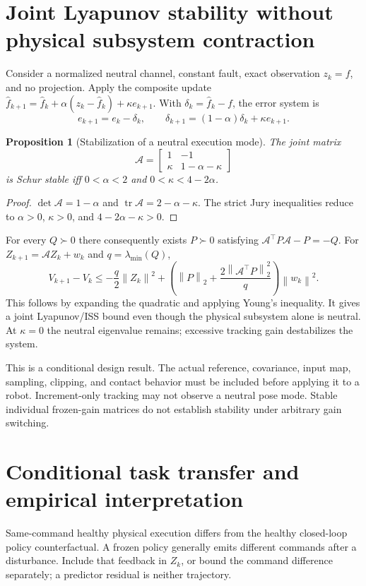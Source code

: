 \documentclass[11pt]{article}
\newtheorem{proposition}{Proposition}
\newcommand{\norm}[1]{\left\lVert#1\right\rVert}
\begin{document}
\section{Joint Lyapunov stability without physical subsystem contraction}
Consider a normalized neutral channel, constant fault, exact observation
$z_k=f$, and no projection. Apply the composite update
$\hat f_{k+1}=\hat f_k+\alpha(z_k-\hat f_k)+\kappa e_{k+1}$.
With $\delta_k=\hat f_k-f$, the error system is
\begin{equation}
 e_{k+1}=e_k-\delta_k,\qquad
 \delta_{k+1}=(1-\alpha)\delta_k+\kappa e_{k+1}.
\end{equation}
\begin{proposition}[Stabilization of a neutral execution mode]
The joint matrix
\[
\mathcal A=\begin{bmatrix}1&-1\\
                   \kappa&1-\alpha-\kappa\end{bmatrix}
\]
is Schur stable iff $0<\alpha<2$ and $0<\kappa<4-2\alpha$.
\end{proposition}
\begin{proof}
$\det\mathcal A=1-\alpha$ and
$\operatorname{tr}\mathcal A=2-\alpha-\kappa$.
The strict Jury inequalities reduce to
$\alpha>0$, $\kappa>0$, and $4-2\alpha-\kappa>0$.
\end{proof}
For every $Q\succ0$ there consequently exists $P\succ0$ satisfying
$\mathcal A^\top P\mathcal A-P=-Q$.
For $Z_{k+1}=\mathcal AZ_k+w_k$ and $q=\lambda_{\min}(Q)$,
\begin{equation}
V_{k+1}-V_k\le-\frac q2\norm{Z_k}^2+
\left(\norm{P}_2+
\frac{2\norm{\mathcal A^\top P}_2^2}{q}\right)\norm{w_k}^2.
\end{equation}
This follows by expanding the quadratic and applying Young's inequality.
It gives a joint Lyapunov/ISS bound even though the physical subsystem
alone is neutral. At $\kappa=0$ the neutral eigenvalue remains; excessive
tracking gain destabilizes the system.

This is a conditional design result. The actual reference, covariance,
input map, sampling, clipping, and contact behavior must be included before
applying it to a robot. Increment-only tracking may not observe a neutral
pose mode. Stable individual frozen-gain matrices do not establish stability
under arbitrary gain switching.

\section{Conditional task transfer and empirical interpretation}
Same-command healthy physical execution differs from the healthy closed-loop
policy counterfactual. A frozen policy generally emits different commands
after a disturbance. Include that feedback in $Z_k$, or bound the command
difference separately; a predictor residual is neither trajectory.
\end{document}
